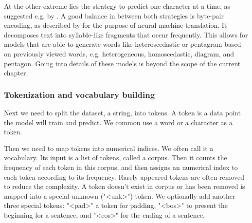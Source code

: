 At the other extreme lies the strategy to predict one character at a time, as suggested e.g. by \citet{Ling2015}. A good balance in between both strategies is byte-pair encoding, as described by \citet{Sennrich2016} for the purpose of neural machine translation. It decomposes text into syllable-like fragments that occur frequently. This allows for models that are able to generate words like heteroscedastic or pentagram based on previously viewed words, e.g. heterogeneous, homoscedastic, diagram, and pentagon. Going into details of these models is beyond the scope of the current chapter. 

\subsubsection{Tokenization and vocabulary building}

Next we need to split the dataset, a string, into tokens. A token is a data point the model will train and predict. We common use a word or a character as a token.

Then we need to map tokens into numerical indices. We often call it a vocabulary. Its input is a list of tokens, called a corpus. Then it counts the frequency of each token in this corpus, and then assigns an numerical index to each token according to its frequency. Rarely appeared tokens are often removed to reduce the complexity. A token doesn’t exist in corpus or has been removed is mapped into a special unknown ("<unk>") token. We optionally add another three special tokens: "<pad>" a token for padding, "<bos>" to present the beginning for a sentence, and "<eos>" for the ending of a sentence.




